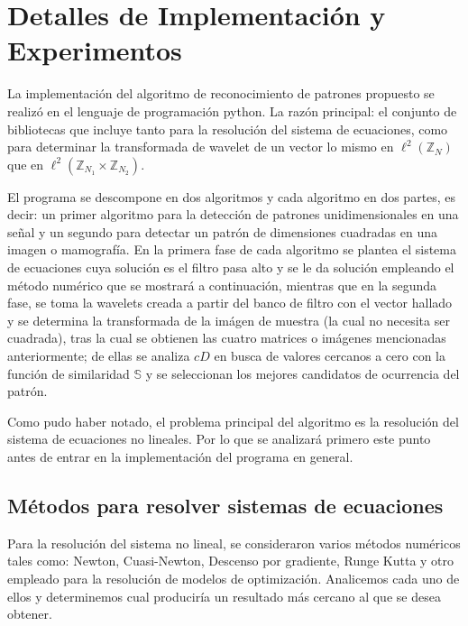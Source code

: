 \chapter{Detalles de Implementación y Experimentos}\label{chapter:implementation}

\par La implementaci\'on del algoritmo de reconocimiento de patrones propuesto se realiz\'o en el lenguaje de programaci\'on python. La raz\'on principal: el conjunto de bibliotecas que incluye tanto para la resoluci\'on del sistema de ecuaciones, como para determinar la transformada de wavelet de un vector lo mismo en $\ell^2(\mathbb{Z}_N)$ que en $\ell^2(\mathbb{Z}_{N_1}\times\mathbb{Z}_{N_2})$.

\par El programa se descompone en dos algoritmos y cada algoritmo en dos partes, es decir: un primer algoritmo para la detecci\'on de patrones unidimensionales en una se\~nal y un segundo para detectar un patr\'on de dimensiones cuadradas en una imagen o mamograf\'ia. En la primera fase de cada algoritmo se plantea el sistema de ecuaciones cuya soluci\'on es el filtro pasa alto y se le da soluci\'on empleando el m\'etodo num\'erico que se mostrar\'a a continuaci\'on, mientras que en la segunda fase, se toma la wavelets creada a partir del banco de filtro con el vector hallado y se determina la transformada de la im\'agen de muestra (la cual no necesita ser cuadrada), tras la cual se obtienen las cuatro matrices o im\'agenes mencionadas anteriormente; de ellas se analiza $cD$ en busca de valores cercanos a cero con la funci\'on de similaridad $\mathbb{S}$ y se seleccionan los mejores candidatos de ocurrencia del patr\'on.\\

\par Como pudo haber notado, el problema principal del algoritmo es la resoluci\'on del sistema de ecuaciones no lineales. Por lo que se analizar\'a primero este punto antes de entrar en la implementaci\'on del programa en general.\\

\section{M\'etodos para resolver sistemas de ecuaciones}

\par Para la resoluci\'on del sistema no lineal, se consideraron varios m\'etodos num\'ericos tales como: Newton, Cuasi-Newton, Descenso por gradiente, Runge Kutta y otro empleado para la resoluci\'on de modelos de optimizaci\'on. Analicemos cada uno de ellos y determinemos cual producir\'ia un resultado m\'as cercano al que se desea obtener.

